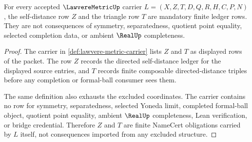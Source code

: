 \begin{theorem}
\label{thm:lawvere-metric-zero-self-exactness}
For every accepted $\LawvereMetricUp$ carrier $L=(X,Z,T,D,Q,R,H,C,P,N)$, the self-distance row $Z$ and the triangle row $T$ are mandatory finite ledger rows. They are not consequences of symmetry, separatedness, quotient point equality, selected completion data, or ambient $\RealUp$ completeness.
\end{theorem}
\begin{proof}
The carrier in \autoref{def:lawvere-metric-carrier} lists $Z$ and $T$ as displayed rows of the packet. The row $Z$ records the directed self-distance ledger for the displayed source entries, and $T$ records finite composable directed-distance triples before any completion or formal-ball consumer sees them.

The same definition also exhausts the excluded coordinates. The carrier contains no row for symmetry, separatedness, selected Yoneda limit, completed formal-ball object, quotient point equality, ambient $\RealUp$ completeness, Lean verification, or bridge credential. Therefore $Z$ and $T$ are finite NameCert obligations carried by $L$ itself, not consequences imported from any excluded structure.
\end{proof}

